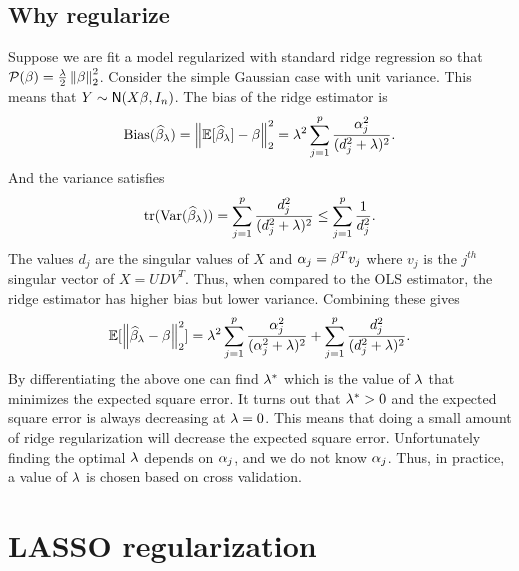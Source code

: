 \subsection{Why regularize}
Suppose we are fit a model regularized with standard ridge regression so that ${\mathcal{P}}(\beta)=\frac{\lambda}{2}\left\|\beta\right\|_2^2$. Consider the simple Gaussian case with unit variance. This means that $Y \sim \mathsf{N}(X\beta,  I_n)$. The bias of the ridge estimator is 
\[\text{Bias}(\widehat{\beta}_\lambda) = \left\|{\mathbb{E}}[\widehat{\beta}_\lambda]-\beta\right\|_2^2 = \lambda^2 \sum_{j=1}^p \frac{{\alpha}_j^2}{(d_j^2+\lambda)^2}. \]
And the variance satisfies
\[\text{tr}(\operatorname{Var}(\widehat{\beta}_\lambda)) = \sum_{j=1}^p \frac{d_j^2}{(d_j^2+\lambda)^2} \le \sum_{j=1}^p \frac{1}{d_j^2}. \]
The values $d_j$ are the singular values of $X$ and ${\alpha}_j = \beta^Tv_j$ where $v_j$ is the $j^{th}$ singular vector of $X = UDV^T$. Thus, when compared to the OLS estimator, the ridge estimator has higher bias but lower variance. Combining these gives
\[{\mathbb{E}}[\left\|\widehat{\beta}_\lambda-\beta\right\|_2^2] = \lambda^2 \sum_{j=1}^p \frac{{\alpha}_j^2}{({\alpha}_j^2+\lambda)^2}+\sum_{j=1}^p \frac{d_j^2}{(d_j^2+\lambda)^2}.\]
By differentiating the above one can find $\lambda^*$ which is the value of $\lambda$ that minimizes the expected square error. It turns out that $\lambda^* > 0$ and the expected square error is always decreasing at $\lambda = 0$. This means that doing a small amount of ridge regularization will decrease the expected square error. Unfortunately finding the optimal $\lambda$ depends on ${\alpha}_j$, and we do not know ${\alpha}_j$. Thus, in practice, a value of $\lambda$ is chosen based on cross validation. 
\section{LASSO regularization}
